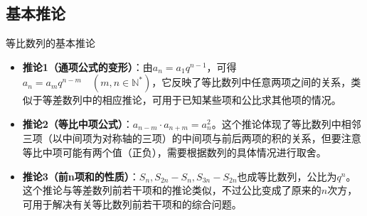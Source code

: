 \documentclass[aspectratio=169]{ctexbeamer} %
\begin{document}
\subsection{基本推论}
\begin{frame}{等比数列的基本推论}
\begin{itemize}
\item \textbf{推论1（通项公式的变形）}：由$a_n = a_1 q^{n-1}$，可得$a_n = a_m q^{n-m}\quad(m, n \in \mathbb{N}^*)$，它反映了等比数列中任意两项之间的关系，类似于等差数列中的相应推论，可用于已知某些项和公比求其他项的情况。
\item \textbf{推论2（等比中项公式）}：$a_{n-m} \cdot a_{n+m} = a_n^2$。这个推论体现了等比数列中相邻三项（以中间项为对称轴的三项）的中间项与前后两项的积的关系，但要注意等比中项可能有两个值（正负），需要根据数列的具体情况进行取舍。
\item \textbf{推论3（前n项和的性质）}：$S_n, S_{2n} - S_n, S_{3n} - S_{2n}$也成等比数列，公比为$q^n$。这个推论与等差数列前若干项和的推论类似，不过公比变成了原来的$n$次方，可用于解决有关等比数列前若干项和的综合问题。
\end{itemize}
\end{frame}
\end{document}

